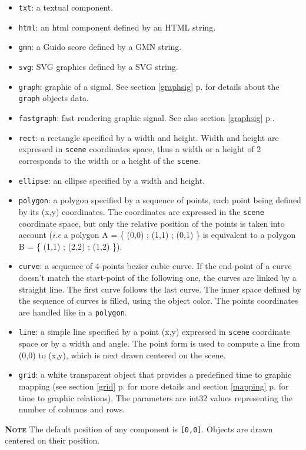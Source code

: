 \documentclass[a4paper,twoside]{report}
\newcommand{\fullref}[1]	{\ref{#1} p.\pageref{#1}}
\newcommand{\OSC}[1]		{\texttt{#1}}
\newcommand{\values}[1]	{\texttt{#1}}
\newcommand{\note}	[1]		{\vspace{2mm}\textbf{\hspace{-1.03cm}\textbf{\textsc{Note #1}}}}
\begin{document}
\begin{itemize}
\item \OSC{txt}: a textual component.
\item \OSC{html}: an html component defined by an HTML string.
\item \OSC{gmn}: a Guido score defined by a GMN string.
\item \OSC{svg}: SVG graphics defined by a SVG string.
\item \OSC{graph}: graphic of a signal. See section \fullref{graphsig} for details about the \OSC{graph} objects data.
\item \OSC{fastgraph}: fast rendering graphic signal. See also section \fullref{graphsig}.
\item \OSC{rect}: a rectangle specified by a width and height. Width and height are expressed in \OSC{scene} coordinates space, thus a width or a height of 2 corresponds to the width or a height of the \OSC{scene}.
\item \OSC{ellipse}: an ellipse specified by a width and height.
\item \OSC{polygon}: a polygon specified by a sequence of points, each point being defined by its (x,y) coordinates. The coordinates are expressed in the \OSC{scene} coordinate space, but only the relative position of the points is taken into account (\emph{i.e} a polygon A = \{ (0,0) ; (1,1) ; (0,1) \} is equivalent to a polygon B = \{ (1,1) ; (2,2) ; (1,2) \}).
\item \OSC{curve}: a sequence of 4-points bezier cubic curve. If the end-point of a curve doesn't match the start-point of the following one, the curves are linked by a straight line. The first curve follows the last curve. The inner space defined by the sequence of curves is filled, using the object color. The points coordinates are handled like in a \OSC{polygon}.
\item \OSC{line}: a simple line specified by a point (x,y) expressed in \OSC{scene} coordinate space or by a width and angle. The point form is used to compute a line from (0,0) to (x,y), which is next drawn centered on the scene.
\item \OSC{grid}: a white transparent object that provides a predefined time to graphic mapping (see section \fullref{grid} for more details and section \fullref{mapping} for time to graphic relations). The parameters are int32 values representing the number of columns and rows.
\end{itemize}

\note{} The default position of any component is \values{[0,0]}. Objects are drawn centered on their position.
\end{document}
